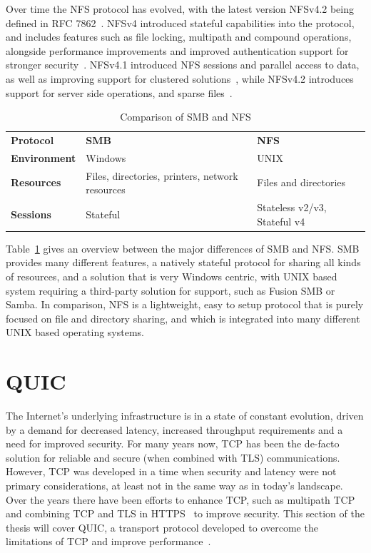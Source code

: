 \documentclass[english, 12pt, a4paper, elec, utf8, a-2b, online]{aaltothesis}
\begin{document}
Over time the NFS protocol has evolved, with the latest version NFSv4.2 being
defined in RFC 7862~\cite{rfc7862}. NFSv4 introduced stateful capabilities into the protocol, and
includes features such as file locking, multipath and compound operations, alongside performance
improvements and improved authentication support for stronger security~\cite{rfc7530}.
NFSv4.1 introduced NFS sessions and parallel access to data, as well as improving support
for clustered solutions~\cite{rfc8881}, while
NFSv4.2 introduces support for server side operations, and sparse files~\cite{rfc7862}.

\begin{table}[h]
	\centering
	\caption{Comparison of SMB and NFS}
	\label{tab:smb_nfs}
	\begin{tabular}{lll}
	\textbf{Protocol} & \textbf{SMB} & \textbf{NFS} \\
	\textbf{Environment}    & Windows     & UNIX    \\
	\textbf{Resources} &  Files, directories, printers, network resources   & Files and directories     \\
	\textbf{Sessions}  & Stateful  & Stateless v2/v3, Stateful v4    \\
	\end{tabular}
\end{table}

Table~\ref{tab:smb_nfs} gives an overview between the major differences of SMB and
NFS. SMB provides many different features, a natively stateful protocol for sharing
all kinds of resources, and a solution that is very Windows centric, with UNIX based
system requiring a third-party solution for support, such as Fusion SMB or
Samba. In comparison, NFS is a lightweight, easy to setup protocol that is purely
focused on file and directory sharing, and which is integrated into many
different UNIX based operating systems.
\clearpage

\section{QUIC}
\label{sec:quic}
The Internet's underlying infrastructure is in a state of constant evolution,
driven by a demand for decreased latency, increased throughput requirements and
a need for improved security. For many years now, TCP has been the de-facto
solution for reliable and secure (when combined with TLS) communications. However,
TCP was developed in a time when security and latency were not primary considerations,
at least not in the same way as in today's landscape. Over the years there have
been efforts to enhance TCP, such as multipath TCP~\cite{rfc8684} and combining
TCP and TLS in HTTPS~\cite{rfc2818} to improve security. This section of the thesis
will cover QUIC, a transport protocol developed to overcome the limitations of TCP
and improve performance~\cite{quic_transport_protocol_design}.
\end{document}

